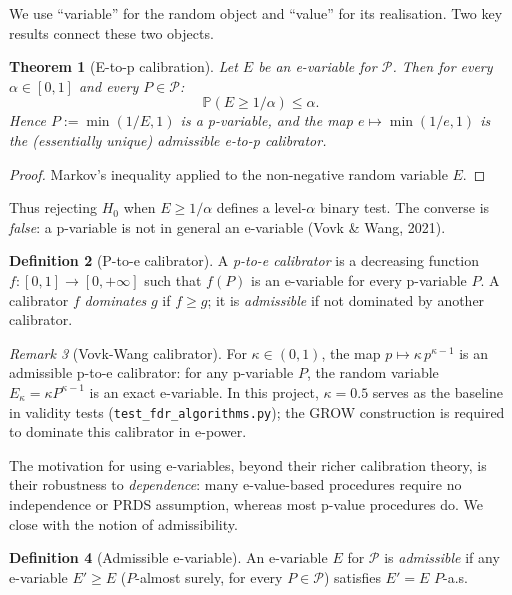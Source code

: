 \documentclass[11pt,a4paper]{article}
\theoremstyle{plain}
\newtheorem{theorem}{Theorem}[section]
\theoremstyle{definition}
\newtheorem{definition}[theorem]{Definition}
\theoremstyle{remark}
\newtheorem{remark}[theorem]{Remark}
\newcommand{\Prob}{\mathbb{P}}
\begin{document}
We use ``variable'' for the random object and ``value'' for its realisation.
Two key results connect these two objects.

\begin{theorem}[E-to-p calibration]
Let $E$ be an e-variable for $\mathcal{P}$. Then for every $\alpha \in [0,1]$
and every $P \in \mathcal{P}$:
\[
  \Prob\!\left(E \geq 1/\alpha\right) \leq \alpha.
\]
Hence $P := \min(1/E, 1)$ is a p-variable, and the map $e \mapsto \min(1/e, 1)$
is the (essentially unique) admissible e-to-p calibrator.
\end{theorem}

\begin{proof}
Markov's inequality applied to the non-negative random variable $E$.
\end{proof}

Thus rejecting $H_0$ when $E \ge 1/\alpha$ defines a level-$\alpha$ binary
test. The converse is \emph{false}: a p-variable is not in general an
e-variable (Vovk \& Wang, 2021).

\begin{definition}[P-to-e calibrator]
A \emph{p-to-e calibrator} is a decreasing function $f : [0,1] \to [0,+\infty]$
such that $f(P)$ is an e-variable for every p-variable $P$. A calibrator $f$
\emph{dominates} $g$ if $f \geq g$; it is \emph{admissible} if not dominated
by another calibrator.
\end{definition}

\begin{remark}[Vovk-Wang calibrator]
For $\kappa \in (0,1)$, the map $p \mapsto \kappa\,p^{\kappa-1}$ is an
admissible p-to-e calibrator: for any p-variable $P$, the random variable
$E_\kappa = \kappa P^{\kappa-1}$ is an exact e-variable. In this project,
$\kappa = 0.5$ serves as the baseline in validity tests
(\texttt{test\_fdr\_algorithms.py}); the GROW
construction is required to dominate this calibrator in e-power.
\end{remark}

The motivation for using e-variables, beyond their richer calibration theory,
is their robustness to \emph{dependence}: many e-value-based procedures
require no independence or PRDS assumption, whereas most p-value procedures
do. We close with the notion of admissibility.

\begin{definition}[Admissible e-variable]
An e-variable $E$ for $\mathcal{P}$ is \emph{admissible} if any e-variable
$E' \geq E$ ($P$-almost surely, for every $P \in \mathcal{P}$) satisfies
$E' = E$ $P$-a.s.
\end{definition}
\end{document}

